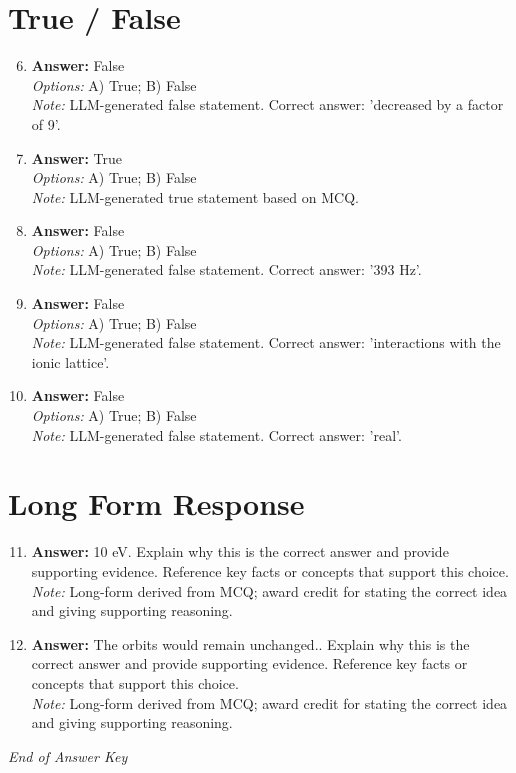 \documentclass[12pt]{article}
\begin{document}
\section*{True / False}
\begin{enumerate}[label=\arabic*.]
\setcounter{enumi}{5}
\item \textbf{Answer:} False
\\ \textit{Options:} A) True; B) False
\\ \textit{Note:} LLM-generated false statement. Correct answer: 'decreased by a factor of 9'.
\item \textbf{Answer:} True
\\ \textit{Options:} A) True; B) False
\\ \textit{Note:} LLM-generated true statement based on MCQ.
\item \textbf{Answer:} False
\\ \textit{Options:} A) True; B) False
\\ \textit{Note:} LLM-generated false statement. Correct answer: '393 Hz'.
\item \textbf{Answer:} False
\\ \textit{Options:} A) True; B) False
\\ \textit{Note:} LLM-generated false statement. Correct answer: 'interactions with the ionic lattice'.
\item \textbf{Answer:} False
\\ \textit{Options:} A) True; B) False
\\ \textit{Note:} LLM-generated false statement. Correct answer: 'real'.
\end{enumerate}

\section*{Long Form Response}
\begin{enumerate}[label=\arabic*.]
\setcounter{enumi}{10}
\item \textbf{Answer:} 10 eV. Explain why this is the correct answer and provide supporting evidence. Reference key facts or concepts that support this choice.
\\ \textit{Note:} Long-form derived from MCQ; award credit for stating the correct idea and giving supporting reasoning.
\item \textbf{Answer:} The orbits would remain unchanged.. Explain why this is the correct answer and provide supporting evidence. Reference key facts or concepts that support this choice.
\\ \textit{Note:} Long-form derived from MCQ; award credit for stating the correct idea and giving supporting reasoning.
\end{enumerate}

\vfill
\noindent\textit{End of Answer Key}
\end{document}
